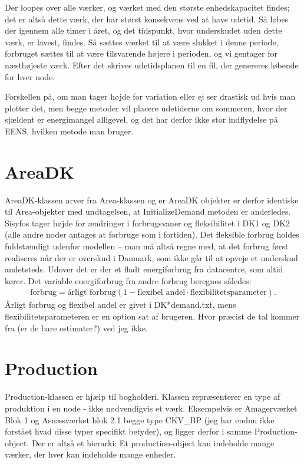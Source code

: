 \documentclass{article}
\begin{document}
Der loopes over alle værker, og værket med den største enhedskapacitet findes; det er altså dette værk, der har størst konsekvens ved at have udetid. Så løbes der igennem alle timer i året, og det tidspunkt, hvor underskudet uden dette værk, er lavest, findes. Så sættes værket til at være slukket i denne periode, forbruget sættes til at være tilsvarende højere i perioden, og vi gentager for næsthøjeste værk. Efter det skrives udetidsplanen til en fil, der genereres løbende for hver node.

Forskellen på, om man tager højde for variation eller ej ser drastisk ud hvis man plotter det, men begge metoder vil placere udetiderne om sommeren, hvor der sjældent er energimangel alligevel, og det har derfor ikke stor indflydelse på EENS, hvilken metode man bruger. 

\section{AreaDK}
AreaDK-klassen arver fra Area-klassen og er AreaDK objekter er derfor identiske til Area-objekter med undtagelsen, at InitializeDemand metoden er anderledes. Sisyfos tager højde for ændringer i forbrugsvaner og fleksibilitet i DK1 og DK2 (alle andre noder antages at forbruge som i fortiden). Det fleksible forbrug holdes fuldstændigt udenfor modellen -- man må altså regne med, at det forbrug først realiseres når der er overskud i Danmark, som ikke går til at opveje et underskud andetsteds. Udover det er der et fladt energiforbrug fra datacentre, som altid kører. Det variable energiforbrug fra andre forbrug beregnes således: 
\begin{align}
    \text{forbrug} = \text{årligt forbrug}(1-\text{flexibel andel} \cdot \text{flexibilitetsparameter}).
\end{align}
Årligt forbrug og flexibel andel er givet i DK*demand.txt, mens flexibilitetsparameteren er en option sat af brugeren. Hvor præcist de tal kommer fra (er de bare estimater?) ved jeg ikke. 
\section{Production}
Production-klassen er hjælp til bogholderi. Klassen repræsenterer en type af produktion i en node - ikke nødvendigvis et værk. Eksempelvis er Amagerværket Blok 1 og Asnæsværket blok 2.1 begge type CKV\_BP (jeg har endnu ikke forstået hvad disse typer specifikt betyder), og ligger derfor i samme Production-object. Der er altså et hierarki: Et production-object kan indeholde mange værker, der hver kan indeholde mange enheder. 
\end{document}
